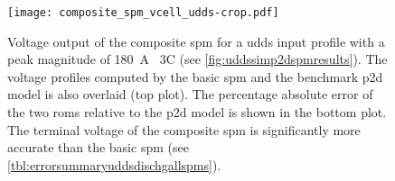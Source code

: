 \begin{figure}[!htb]
    \centering
    \texttt{[image: composite\_spm\_vcell\_udds-crop.pdf]}
    \caption[%
    Terminal voltage output of --- \emph{a}) the  model, \emph{b}) the
    basic , and \emph{c}) the composite  for a
     input profile
    ]%
    {%
        Voltage output of the composite \gls{spm} for a \gls{udds} input profile
        with a peak magnitude of \SI{180}{\ampere} \ie~3C
        (see \cref{fig:uddssimp2dspmresults}). The voltage
        profiles computed by the basic \gls{spm} and the benchmark \gls{p2d}
        model is also overlaid (top plot). The percentage absolute error of the
        two \glspl{rom} relative to the \gls{p2d} model is shown in the bottom
        plot. The terminal voltage of the composite \gls{spm} is significantly
        more accurate than the basic \gls{spm}
        (see \cref{tbl:errorsummaryuddsdischgallspms}).
    }%
    \label{fig:voltageoutputcompareallSPMsudds}
\end{figure}








